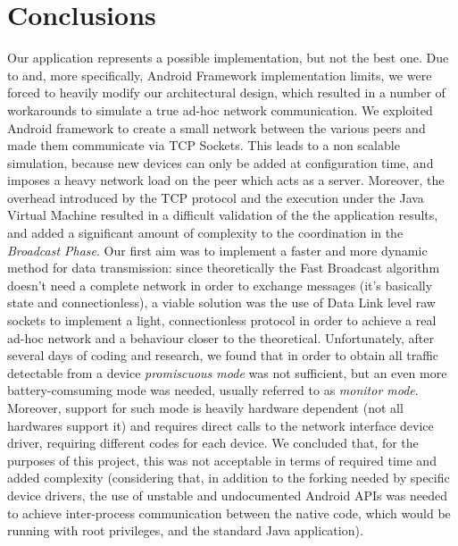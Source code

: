 \section{Conclusions}
	Our application represents a possible implementation, but not the best one. Due to \direct and, more specifically, Android \direct Framework implementation limits, we were forced to heavily modify our architectural design, which resulted in a number of workarounds to simulate a true ad-hoc network communication. We exploited Android \direct framework to create a small network between the various peers and made them communicate via TCP Sockets. This leads to a non scalable simulation, because new devices can only be added at configuration time, and imposes a heavy network load on the peer which acts as a server.
	Moreover, the overhead introduced by the TCP protocol and the execution under the Java Virtual Machine resulted in a difficult validation of the the application results, and added a significant amount of complexity to the coordination in the \textit{Broadcast Phase}.
	Our first aim was to implement a faster and more dynamic method for data transmission: since theoretically the Fast Broadcast algorithm doesn't need a complete network in order to exchange messages (it's basically state and connectionless), a viable solution was the use of Data Link level raw sockets to implement a light, connectionless protocol in order to achieve a real ad-hoc network and a behaviour closer to the theoretical. Unfortunately, after several days of coding and research, we found that in order to obtain all traffic detectable from a device \textit{promiscuous mode} was not sufficient, but an even more battery-comsuming mode was needed, usually referred to as \textit{monitor mode}. Moreover, support for such mode is heavily hardware dependent (not all hardwares support it) and requires direct calls to the network interface device driver, requiring different codes for each device. We concluded that, for the purposes of this project, this was not acceptable in terms of required time and added complexity (considering that, in addition to the forking needed by specific device drivers, the use of unstable and undocumented Android APIs was needed to achieve inter-process communication between the native code, which would be running with root privileges, and the standard Java application).

